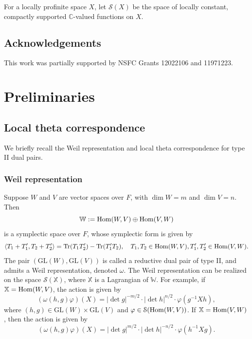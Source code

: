 \documentclass[11pt,reqno]{amsart}
\renewcommand{\1}{{\mathbf{1}}} \newcommand{\sB}{{\mathscr{B}}}
\newcommand{\BC}{{\mathbb {C}}} \newcommand{\BD}{{\mathbb {D}}}
\newcommand{\BW}{{\mathbb {W}}} \newcommand{\BX}{{\mathbb {X}}}
\newcommand{\CS}{{\mathcal {S}}} \newcommand{\CT}{{\mathcal {T}}}
\newcommand{\GL}{{\mathrm{GL}}}\newcommand{\G}{{\mathrm{G}}}
\newcommand{\Tr}{{\mathrm{Tr}}}
\newcommand{\pair}[1]{\langle {#1} \rangle}
\theoremstyle{plain}
\theoremstyle{definition}
\numberwithin{equation}{section}
\begin{document}
For a locally profinite space $X$, let $\CS(X)$ be the space of locally constant, compactly supported $\BC$-valued functions on $X$.



\subsection{Acknowledgements}
This work was partially
supported by NSFC Grants 12022106 and 11971223.\section{Preliminaries}




\subsection{Local theta correspondence} We briefly recall the Weil representation and local theta correspondence for type II dual pairs.

\subsubsection{Weil representation} Suppose $W$ and $V$ are vector spaces over $F$, with $\dim W=m$ and $\dim V=n$. Then $$\BW:=\Hom(W,V)\oplus\Hom(V,W)$$ is a symplectic space over $F$,  whose symplectic form is given by
$$\pair{T_1+T_1',T_2+T_2'}=\Tr(T_1T_2')-\Tr(T_1'T_2),\quad T_1,T_2\in\Hom(W,V), T'_1,T'_2\in\Hom(V,W).$$  The pair $(\GL(W),\GL(V))$ is called a reductive dual pair of type II, and admits a Weil representation, denoted $\omega$. The Weil representation can be realized on the space $\CS(\BX)$, where $\BX$ is a Lagrangian of $\BW$. For example, if $\BX=\Hom(W,V)$, the action is given by
$$\left(\omega(h,g) \varphi\right)(X)=|\det g|^{-m/2}\cdot|\det h|^{n/2}\cdot\varphi(g^{-1}Xh),$$ where $(h,g)\in\GL(W)\times\GL(V)$ and $\varphi\in\CS(\Hom(W,V))$. If  $\BX=\Hom(V,W)$, then the action is given by
$$\left(\omega(h,g) \varphi\right)(X)=|\det g|^{m/2}\cdot|\det h|^{-n/2}\cdot\varphi(h^{-1}Xg).$$
\end{document}

